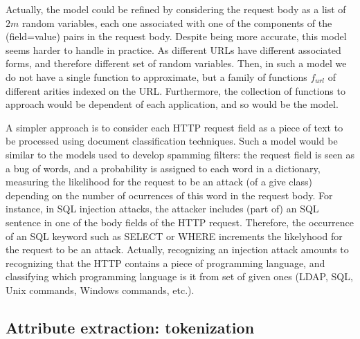 \documentclass[runningheads,a4paper]{llncs}
\begin{document}
Actually, the model could be refined by considering the request body as a list of $2m$ random variables, each one associated with one of the components of the (field=value) pairs in the request body. Despite being more accurate, this model seems harder to handle in practice. As different URLs have different associated forms, and therefore different set of random variables. Then, in such a model we do not have a single function to approximate, but a family of functions $f_{url}$ of different arities indexed on the URL. Furthermore, the collection of functions to approach would be dependent of each application, and so would be the model. 

A simpler approach is to consider each HTTP request field as a piece of text to be processed using document classification techniques. Such a model would be similar to the models used to develop spamming filters: the request field is seen as a bug of words, and a probability is assigned to each word in a dictionary, measuring the likelihood for the request to be an attack (of a give class) depending on the number of ocurrences of this word in the request body. For instance, in SQL injection attacks, the attacker includes (part of) an SQL sentence in one of the body fields of the HTTP request. Therefore, the occurrence of an SQL keyword such as SELECT or WHERE increments the likelyhood for the request to be an attack. Actually, recognizing an injection attack amounts to recognizing that the HTTP contains a piece of programming language, and classifying which programming language is it from set of given ones (LDAP, SQL, Unix commands, Windows commands, etc.).

\subsection{Attribute extraction: tokenization}
\end{document}
